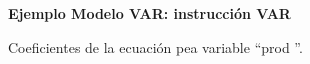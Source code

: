 	\begin{figure}[H]
		\centering
		\textbf{Ejemplo Modelo VAR: instrucción VAR}\par\medskip
		\caption{Coeficientes de la ecuación pea variable \textquotedblleft prod \textquotedblright.}\label{fig35}
	\end{figure}
	

